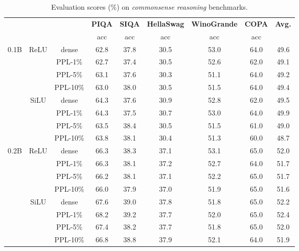 \documentclass{article} %
\begin{document}
\begin{table}[ht]
\caption{Evaluation scores (\%) on \textit{commonsense reasoning} benchmarks.}
\footnotesize
\label{table:commonsense-reasoning}
\begin{center}
\begin{tabular}{c|c|c|cccccc}
\toprule
\multicolumn{3}{c}{} & \textbf{PIQA} & \textbf{SIQA} & \textbf{HellaSwag} & \textbf{WinoGrande} & \textbf{COPA} & \multirow{2}{*}{\textbf{Avg.}} \\
\cmidrule{4-8}
\multicolumn{3}{c}{} & acc & acc & acc & acc & acc \\

\midrule
\multirow{8}{*}{0.1B} & \multirow{4}{*}{ReLU} 
& dense & 62.8 & 37.8 & 30.5 & 53.0 & 64.0 & 49.6 \\
& & PPL-1\% & 62.7 & 37.4 & 30.5 & 52.6 & 62.0 & 49.1 \\
& & PPL-5\% & 63.1 & 37.6 & 30.3 & 51.1 & 64.0 & 49.2 \\
& & PPL-10\% & 63.0 & 38.0 & 30.5 & 51.5 & 64.0 & 49.4 \\
\cmidrule{2-9}
& \multirow{4}{*}{SiLU} 
& dense & 64.3 & 37.6 & 30.9 & 52.8 & 62.0 & 49.5 \\
& & PPL-1\% & 64.3 & 37.5 & 30.7 & 53.0 & 64.0 & 49.9 \\
& & PPL-5\% & 63.5 & 38.4 & 30.5 & 51.5 & 61.0 & 49.0 \\
& & PPL-10\% & 63.8 & 38.1 & 30.4 & 51.3 & 60.0 & 48.7 \\

\midrule
\multirow{8}{*}{0.2B} & \multirow{4}{*}{ReLU} 
& dense  & 66.3 & 38.3 & 37.1 & 53.1 & 65.0 & 52.0 \\
& & PPL-1\%  & 66.3 & 38.1 & 37.2 & 52.7 & 64.0 & 51.7 \\
& & PPL-5\%  & 66.2 & 38.1 & 37.1 & 52.2 & 65.0 & 51.7 \\
& & PPL-10\% & 66.0 & 37.9 & 37.0 & 51.9 & 65.0 & 51.6 \\
\cmidrule{2-9}
& \multirow{4}{*}{SiLU} 
& dense  & 67.6 & 39.0 & 37.8 & 51.8 & 65.0 & 52.2 \\
& & PPL-1\%  & 68.2 & 39.2 & 37.7 & 52.0 & 65.0 & 52.4 \\
& & PPL-5\%  & 67.4 & 38.2 & 37.7 & 51.8 & 65.0 & 52.0 \\
& & PPL-10\% & 66.8 & 38.8 & 37.9 & 52.1 & 64.0 & 51.9 \\


\end{tabular}
\end{center}
\end{table}
\end{document}

